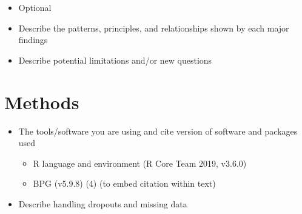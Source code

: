\documentclass[]{article}
\def\tightlist{}
\begin{document}
\begin{itemize}
\tightlist
\item
  Optional
\item
  Describe the patterns, principles, and relationships shown by each major findings
\item
  Describe potential limitations and/or new questions
\end{itemize}

\hypertarget{methods}{%
\section{Methods}\label{methods}}

\begin{itemize}
\tightlist
\item
  The tools/software you are using and cite version of software and packages used

  \begin{itemize}
  \tightlist
  \item
    R language and environment (R Core Team 2019, v3.6.0)
  \item
    BPG (v5.9.8) (4) (to embed citation within text)
  \end{itemize}
\item
  Describe handling dropouts and missing data
\end{itemize}
\end{document}
